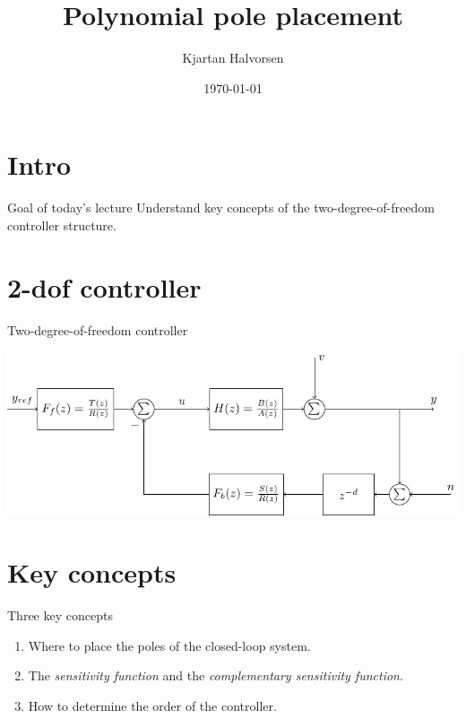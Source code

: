 \documentclass[presentation,aspectratio=169]{beamer}
\author{Kjartan Halvorsen}
\date{\today}
\title{Polynomial pole placement}
\begin{document}
\maketitle


\section{Intro}
\label{sec:org8473273}

\begin{frame}[label={sec:orgf130457}]{Goal of today's lecture}
Understand key concepts of the two-degree-of-freedom controller structure.
\end{frame}


\section{2-dof controller}
\label{sec:org8ecad3b}

\begin{frame}[label={sec:org79b98bd}]{Two-degree-of-freedom controller}
\begin{center}
\includegraphics[width=0.8\linewidth]{../../figures/2dof-block-explicit}
\end{center}
\end{frame}

\section{Key concepts}
\label{sec:org1d7ff68}
\begin{frame}[label={sec:orgf6d6ee9}]{Three key concepts}
\begin{enumerate}
\item Where to place the poles of the closed-loop system.
\item The \emph{sensitivity function} and the \emph{complementary sensitivity function}.
\item How to determine the order of the controller.
\end{enumerate}
\end{frame}
\end{document}
